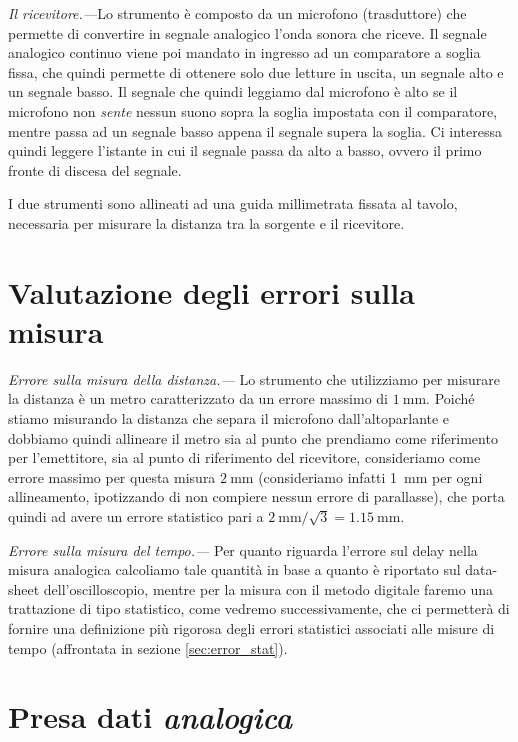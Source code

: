 \documentclass[
    rmp,
    reprint, 
    superscriptaddress, 
    altaffilletter, 
    amsmath, 
    amssymb, 
    a4paper,
    varvw]{revtex4-2}
\begin{document}
\noindent\textit{Il ricevitore.---}Lo strumento è composto da un microfono (trasduttore) che permette di convertire in segnale analogico l'onda sonora che riceve. Il segnale analogico continuo viene poi mandato in ingresso ad un comparatore a soglia fissa\iffalse(automaticamente impostata ad un valore di \SI{00}{\volt})\fi, che quindi permette di ottenere solo due letture in uscita, un segnale alto e un segnale basso. Il segnale che quindi leggiamo dal microfono è alto se il microfono non \emph{sente} nessun suono sopra la soglia impostata con il comparatore, mentre passa ad un segnale basso appena il segnale supera la soglia. Ci interessa quindi leggere l'istante in cui il segnale passa da alto a basso, ovvero il primo fronte di discesa del segnale. 

I due strumenti sono allineati ad una guida millimetrata fissata al tavolo, necessaria per misurare la distanza tra la sorgente e il ricevitore. 

\section{Valutazione degli errori sulla misura}
\noindent\textit{Errore sulla misura della distanza.---} Lo strumento che utilizziamo per misurare la distanza è un metro caratterizzato da un errore massimo di $\SI{1}{\milli\metre}$. Poiché stiamo misurando la distanza che separa il microfono dall'altoparlante e dobbiamo quindi allineare il metro sia al punto che prendiamo come riferimento per l'emettitore, sia al punto di riferimento del ricevitore, consideriamo come errore massimo per questa misura $\SI{2}{\milli\metre}$ (consideriamo infatti \SI{1}{\milli\metre} per ogni allineamento, ipotizzando di non compiere nessun errore di parallasse), che porta quindi ad avere un errore statistico pari a $\SI{2}{\milli\metre}/\sqrt{3} = \SI{1.15}{\milli\metre}$.

\noindent\textit{Errore sulla misura del tempo.---} Per quanto riguarda l'errore sul delay nella misura analogica calcoliamo tale quantità in base a quanto è riportato sul data-sheet dell'oscilloscopio, mentre per la misura con il metodo digitale faremo una trattazione di tipo statistico, come vedremo successivamente, che ci permetterà di fornire una definizione più rigorosa degli errori statistici associati alle misure di tempo (affrontata in sezione \ref{sec:error_stat}).


\section{Presa dati \emph{analogica}}
\end{document}
